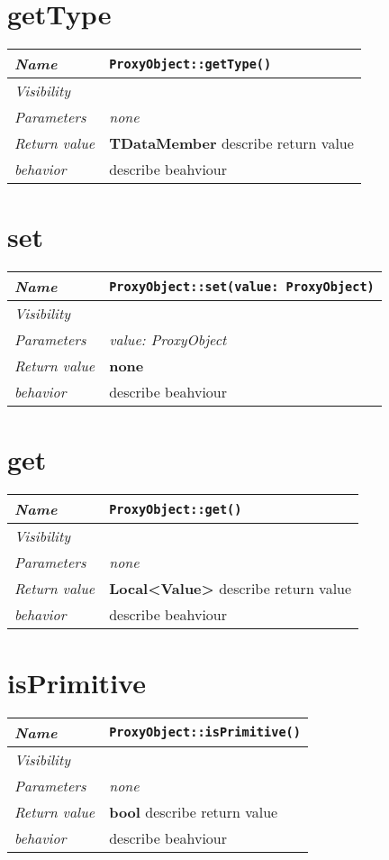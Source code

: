  \section{getType}
\begin{longtable}{p{3cm} @{\hskip 1cm} p{12cm}}
 \hline
\textit{Name} & \texttt{ProxyObject::getType()}\\
\hline
 \textit{Visibility} & \\
\hline
\textit{Parameters} & \textit{none}\\
\hline
\textit{Return value} & \textbf{ TDataMember} describe return value\\
  \hline
 \textit{behavior} & describe beahviour \\
\hline
\end{longtable} \pagebreak
 \section{set}
\begin{longtable}{p{3cm} @{\hskip 1cm} p{12cm}}
 \hline
\textit{Name} & \texttt{ProxyObject::set(value: ProxyObject)}\\
\hline
 \textit{Visibility} & \\
\hline
\textit{Parameters} & \textit{value: ProxyObject}\\
\hline
\textit{Return value} & \textbf{none}\\
  \hline
 \textit{behavior} & describe beahviour \\
\hline
\end{longtable} \pagebreak
 \section{get}
\begin{longtable}{p{3cm} @{\hskip 1cm} p{12cm}}
 \hline
\textit{Name} & \texttt{ProxyObject::get()}\\
\hline
 \textit{Visibility} & \\
\hline
\textit{Parameters} & \textit{none}\\
\hline
\textit{Return value} & \textbf{ Local<Value>} describe return value\\
  \hline
 \textit{behavior} & describe beahviour \\
\hline
\end{longtable} \pagebreak
 \section{isPrimitive}
\begin{longtable}{p{3cm} @{\hskip 1cm} p{12cm}}
 \hline
\textit{Name} & \texttt{ProxyObject::isPrimitive()}\\
\hline
 \textit{Visibility} & \\
\hline
\textit{Parameters} & \textit{none}\\
\hline
\textit{Return value} & \textbf{ bool} describe return value\\
  \hline
 \textit{behavior} & describe beahviour \\
\hline
\end{longtable} \pagebreak
